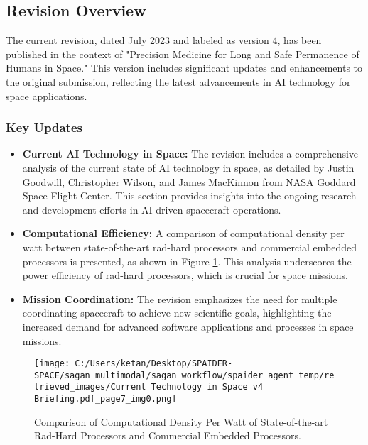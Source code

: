 \documentclass[a4paper,12pt]{article}
\begin{document}
\subsection{Revision Overview}

The current revision, dated July 2023 and labeled as version 4, has been published in the context of "Precision Medicine for Long and Safe Permanence of Humans in Space." This version includes significant updates and enhancements to the original submission, reflecting the latest advancements in AI technology for space applications.

\subsubsection{Key Updates}

\begin{itemize}
    \item \textbf{Current AI Technology in Space:} The revision includes a comprehensive analysis of the current state of AI technology in space, as detailed by Justin Goodwill, Christopher Wilson, and James MacKinnon from NASA Goddard Space Flight Center. This section provides insights into the ongoing research and development efforts in AI-driven spacecraft operations.
    \item \textbf{Computational Efficiency:} A comparison of computational density per watt between state-of-the-art rad-hard processors and commercial embedded processors is presented, as shown in Figure \ref{fig:comp-density}. This analysis underscores the power efficiency of rad-hard processors, which is crucial for space missions.
    \item \textbf{Mission Coordination:} The revision emphasizes the need for multiple coordinating spacecraft to achieve new scientific goals, highlighting the increased demand for advanced software applications and processes in space missions.
\end{itemize}

\begin{figure}[htbp]
    \centering
    \texttt{[image: C:/Users/ketan/Desktop/SPAIDER-SPACE/sagan\_multimodal/sagan\_workflow/spaider\_agent\_temp/retrieved\_images/Current Technology in Space v4 Briefing.pdf\_page7\_img0.png]}
    \caption{Comparison of Computational Density Per Watt of State-of-the-art Rad-Hard Processors and Commercial Embedded Processors.}
    \label{fig:comp-density}
\end{figure}
\end{document}
